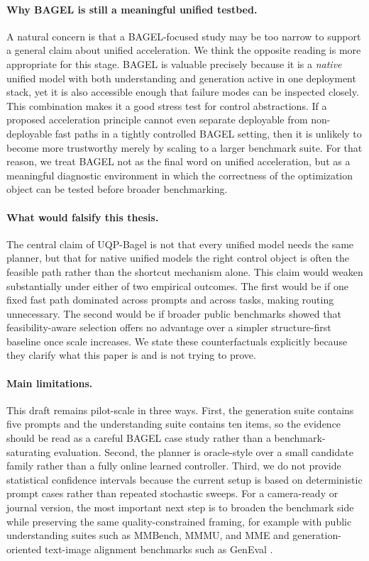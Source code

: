 \documentclass{article}
\begin{document}
\paragraph{Why BAGEL is still a meaningful unified testbed.} A natural concern is that a BAGEL-focused study may be too narrow to support a general claim about unified acceleration. We think the opposite reading is more appropriate for this stage. BAGEL is valuable precisely because it is a \emph{native} unified model with both understanding and generation active in one deployment stack, yet it is also accessible enough that failure modes can be inspected closely. This combination makes it a good stress test for control abstractions. If a proposed acceleration principle cannot even separate deployable from non-deployable fast paths in a tightly controlled BAGEL setting, then it is unlikely to become more trustworthy merely by scaling to a larger benchmark suite. For that reason, we treat BAGEL not as the final word on unified acceleration, but as a meaningful diagnostic environment in which the correctness of the optimization object can be tested before broader benchmarking.

\paragraph{What would falsify this thesis.} The central claim of UQP-Bagel is not that every unified model needs the same planner, but that for native unified models the right control object is often the feasible path rather than the shortcut mechanism alone. This claim would weaken substantially under either of two empirical outcomes. The first would be if one fixed fast path dominated across prompts and across tasks, making routing unnecessary. The second would be if broader public benchmarks showed that feasibility-aware selection offers no advantage over a simpler structure-first baseline once scale increases. We state these counterfactuals explicitly because they clarify what this paper is and is not trying to prove.

\paragraph{Main limitations.} This draft remains pilot-scale in three ways. First, the generation suite contains five prompts and the understanding suite contains ten items, so the evidence should be read as a careful BAGEL case study rather than a benchmark-saturating evaluation. Second, the planner is oracle-style over a small candidate family rather than a fully online learned controller. Third, we do not provide statistical confidence intervals because the current setup is based on deterministic prompt cases rather than repeated stochastic sweeps. For a camera-ready or journal version, the most important next step is to broaden the benchmark side while preserving the same quality-constrained framing, for example with public understanding suites such as MMBench, MMMU, and MME and generation-oriented text-image alignment benchmarks such as GenEval \citep{mmbench,mmmu,mme,geneval}.
\end{document}
